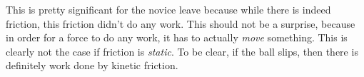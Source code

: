 \documentclass[11pt]{article}
\newcommand{\mb}[1]{\mathbf{#1}}
\begin{document}
This is pretty significant for the novice leave because while there is indeed
friction, this friction didn't do any work. This should not be a surprise,
because in order for a force to do any work, it has to actually \emph{move}
something. This is clearly not the case if friction is \emph{static}. To be
clear, if the ball slips, then there is definitely work done by kinetic
friction.
%
%
%
%
%
%
%
\end{document}
